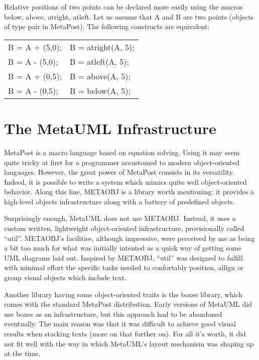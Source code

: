 \documentclass{article}
\newcommand{\code}{\ttfamily}
\begin{document}
Relative positions of two points can be declared more easily using the macros {\code below}, {\code above}, {\code atright}, {\code atleft}.
Let us assume that {\code A} and {\code B} are two points (objects of type {\code pair} in MetaPost). The following constructs are equivalent:

\begin{tabular}{||l|l||}
\hline
{\code B = A + (5,0);} & {\code B = atright(A, 5);} \\
{\code B = A - (5,0);} & {\code B = atleft(A, 5);} \\
{\code B = A + (0,5);} & {\code B = above(A, 5);} \\
{\code B = A - (0,5);} & {\code B = below(A, 5);} \\
\hline
\end{tabular}


\section{The MetaUML Infrastructure}
\label{section:infrastructure}

MetaPost is a macro language based on equation solving. Using it may seem quite
tricky at first for a programmer accustomed to modern object-oriented languages.
However, the great power of MetaPost consists in its versatility. Indeed, it is possible to write
a system which mimics quite well object-oriented behavior. Along this line, METAOBJ
\cite{metaobj} is a library worth mentioning: it provides a high-level objects
infrastructure along with a battery of predefined objects.

Surprisingly enough, MetaUML does not use METAOBJ. Instead, it uses a custom written,
lightweight object-oriented infrastructure, provisionally called ``{\code util}''.
METAOBJ's facilities, although impressive, were perceived by me as being a bit too much
for what was initially intented as a quick way of getting some UML diagrams laid out.
Inspired by METAOBJ, ``{\code util}'' was designed to fulfill with minimal effort
the specific tasks needed to confortably position, allign or group visual objects
which include text.

Another library having some object-oriented traits is the {\code boxes}
library, which comes with the standard MetaPost distribution. Early versions of
MetaUML did use {\code boxes} as an infrastructure, but this approach had to be abandoned eventually.
The main reason was that it was difficult to achieve good visual results when stacking texts
(more on that further on). For all it's worth, it did not fit well with the way in which MetaUML's
layout mechanism was shaping up at the time.
\end{document}
